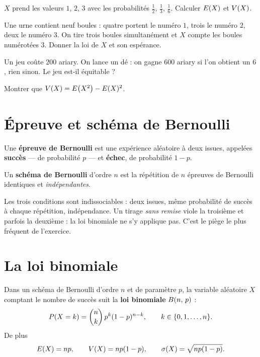 \begin{entrainement}
\exo[\niveau{1}] $X$ prend les valeurs $1$, $2$, $3$ avec les probabilités
$\frac12$, $\frac13$, $\frac16$. Calculer $\Esp(X)$ et $\Var(X)$.

\exo[\niveau{2}] Une urne contient neuf boules : quatre portent le numéro $1$,
trois le numéro $2$, deux le numéro $3$. On tire trois boules simultanément et
$X$ compte les boules numérotées $3$. Donner la loi de $X$ et son espérance.

\exo[\niveau{2}] Un jeu coûte $200$ ariary. On lance un dé : on gagne $600$
ariary si l'on obtient un $6$, rien sinon. Le jeu est-il équitable ?

\exo[\niveau{3}] Montrer que
$\Var(X) = \Esp\!\left(X^{2}\right)-\Esp(X)^{2}$.
\end{entrainement}

\section{Épreuve et schéma de Bernoulli}

\begin{definition}
Une \textbf{épreuve de Bernoulli} est une expérience aléatoire à deux issues,
appelées \textbf{succès} — de probabilité $p$ — et \textbf{échec}, de
probabilité $1-p$.

Un \textbf{schéma de Bernoulli} d'ordre $n$ est la répétition de $n$ épreuves
de Bernoulli identiques et \emph{indépendantes}.
\end{definition}

\begin{avertissement}
Les trois conditions sont indissociables : deux issues, même probabilité de
succès à chaque répétition, indépendance. Un tirage \emph{sans remise} viole
la troisième et parfois la deuxième : la loi binomiale ne s'y applique pas.
C'est le piège le plus fréquent de l'exercice.
\end{avertissement}

\section{La loi binomiale}

\begin{theoreme}
Dans un schéma de Bernoulli d'ordre $n$ et de paramètre $p$, la variable
aléatoire $X$ comptant le nombre de succès suit la \textbf{loi binomiale}
$\loibin{n}{p}$ :
\[
  \proba{X = k} = \combi{k}{n}\,p^{k}(1-p)^{n-k},
  \qquad k \in \{0,1,\dots,n\}.
\]
De plus
\[
  \Esp(X) = np, \qquad \Var(X) = np(1-p), \qquad
  \ecart(X) = \sqrt{np(1-p)} .
\]
\end{theoreme}

